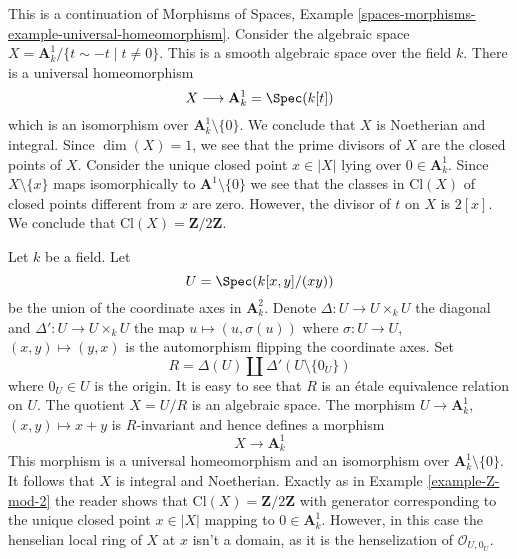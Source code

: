 \begin{example}
\label{example-Z-mod-2}
This is a continuation of Morphisms of Spaces, Example
\ref{spaces-morphisms-example-universal-homeomorphism}.
Consider the algebraic space
$X = \mathbf{A}^1_k/\{t \sim -t \mid t \not = 0\}$.
This is a smooth algebraic space over the field $k$.
There is a universal homeomorphism
$$
X \longrightarrow \mathbf{A}^1_k = \Spec(k[t])
$$
which is an isomorphism over $\mathbf{A}^1_k \setminus \{0\}$.
We conclude that $X$ is Noetherian and integral.
Since $\dim(X) = 1$, we see that the prime divisors of $X$ are
the closed points of $X$.
Consider the unique closed point $x \in |X|$ lying over $0 \in \mathbf{A}^1_k$.
Since $X \setminus \{x\}$ maps isomorphically to $\mathbf{A}^1 \setminus \{0\}$
we see that the classes in $\text{Cl}(X)$ of closed points different
from $x$ are zero. However, the divisor of $t$ on $X$ is $2[x]$.
We conclude that $\text{Cl}(X) = \mathbf{Z}/2\mathbf{Z}$.
\end{example}

\begin{example}
\label{example-not-a-domain}
Let $k$ be a field. Let
$$
U = \Spec(k[x, y]/(xy))
$$
be the union of the coordinate axes in $\mathbf{A}^2_k$.
Denote $\Delta : U \to U \times_k U$ the diagonal and
$\Delta' : U \to U \times_k U$ the map $u \mapsto (u, \sigma(u))$
where $\sigma : U \to U$, $(x, y) \mapsto (y, x)$
is the automorphism flipping the coordinate axes. Set
$$
R = \Delta(U) \amalg \Delta'(U \setminus \{0_U\})
$$
where $0_U \in U$ is the origin. It is easy to see that
$R$ is an \'etale equivalence relation on $U$. The quotient $X = U/R$
is an algebraic space. The morphism $U \to \mathbf{A}^1_k$,
$(x, y) \mapsto x + y$ is $R$-invariant and hence defines
a morphism
$$
X \longrightarrow \mathbf{A}^1_k
$$
This morphism is a universal homeomorphism and an isomorphism over
$\mathbf{A}^1_k \setminus \{0\}$. It follows that $X$ is integral
and Noetherian. Exactly as in Example \ref{example-Z-mod-2}
the reader shows that $\text{Cl}(X) = \mathbf{Z}/2\mathbf{Z}$
with generator corresponding to the unique closed point $x \in |X|$
mapping to $0 \in \mathbf{A}^1_k$. However, in this case the henselian
local ring of $X$ at $x$ isn't a domain, as it is the henselization
of $\mathcal{O}_{U, 0_U}$.
\end{example}














